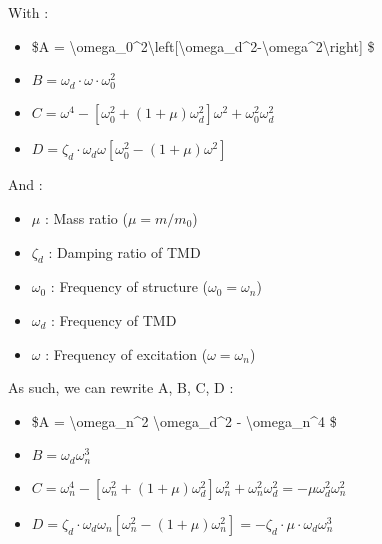 With :

\begin{itemize}
\tightlist
\item
  \$A =
  \textbackslash omega\_0\^{}2\textbackslash left{[}\textbackslash omega\_d\^{}2-\textbackslash omega\^{}2\textbackslash right{]}
  \$
\item
  \(B = \omega_d \cdot \omega \cdot \omega_0^2\)
\item
  \(C = \omega^4-\left[\omega_0^2+(1+\mu) \omega_d^2\right] \omega^2+\omega_0^2 \omega_d^2\)
\item
  \(D = \zeta_d \cdot \omega_d \omega\left[\omega_0^2-(1+\mu) \omega^2\right]\)
\end{itemize}

And :

\begin{itemize}
\tightlist
\item
  \(\mu\) : Mass ratio (\(\mu=m / m_0\))
\item
  \(\zeta_d\) : Damping ratio of TMD
\item
  \(\omega_0\) : Frequency of structure (\(\omega_0 = \omega_n\))
\item
  \(\omega_d\) : Frequency of TMD
\item
  \(\omega\) : Frequency of excitation (\(\omega = \omega_n\))
\end{itemize}

As such, we can rewrite A, B, C, D :

\begin{itemize}
\tightlist
\item
  \$A = \textbackslash omega\_n\^{}2 \textbackslash omega\_d\^{}2 -
  \textbackslash omega\_n\^{}4 \$
\item
  \(B = \omega_d \omega_n^3\)
\item
  \(C = \omega_n^4-\left[\omega_n^2+(1+\mu) \omega_d^2\right] \omega_n^2+\omega_n^2 \omega_d^2 = - \mu \omega_d^2 \omega_n^2\)
\item
  \(D = \zeta_d \cdot \omega_d \omega_n \left[\omega_n^2-(1+\mu) \omega_n^2\right] = - \zeta_d \cdot \mu \cdot \omega_d \omega_n^3\)
\end{itemize}

\begin{Shaded}
\begin{Highlighting}[]
\OperatorTok{=}  
\OperatorTok{=}  
\OperatorTok{=} 
\end{Highlighting}
\end{Shaded}

